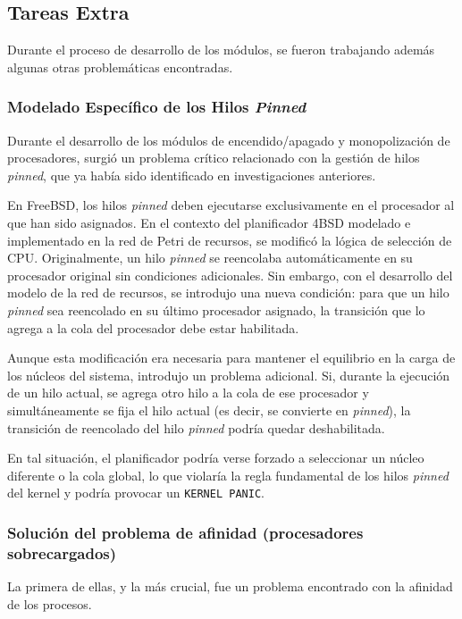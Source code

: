 \subsection{Tareas Extra}

Durante el proceso de desarrollo de los módulos, se fueron trabajando además algunas otras problemáticas encontradas.

\subsubsection{Modelado Específico de los Hilos \textit{Pinned}}

Durante el desarrollo de los módulos de encendido/apagado y monopolización de procesadores, surgió un problema crítico relacionado con la gestión de hilos \textit{pinned}, que ya había sido identificado en investigaciones anteriores.

En FreeBSD, los hilos \textit{pinned} deben ejecutarse exclusivamente en el procesador al que han sido asignados. En el contexto del planificador 4BSD modelado e implementado en la red de Petri de recursos, se modificó la lógica de selección de CPU. Originalmente, un hilo \textit{pinned} se reencolaba automáticamente en su procesador original sin condiciones adicionales. Sin embargo, con el desarrollo del modelo de la red de recursos, se introdujo una nueva condición: para que un hilo \textit{pinned} sea reencolado en su último procesador asignado, la transición que lo agrega a la cola del procesador debe estar habilitada.

Aunque esta modificación era necesaria para mantener el equilibrio en la carga de los núcleos del sistema, introdujo un problema adicional. Si, durante la ejecución de un hilo actual, se agrega otro hilo a la cola de ese procesador y simultáneamente se fija el hilo actual (es decir, se convierte en \textit{pinned}), la transición de reencolado del hilo \textit{pinned} podría quedar deshabilitada.

En tal situación, el planificador podría verse forzado a seleccionar un núcleo diferente o la cola global, lo que violaría la regla fundamental de los hilos \textit{pinned} del kernel y podría provocar un \texttt{KERNEL PANIC}.

\subsubsection{Solución del problema de afinidad (procesadores sobrecargados)}

La primera de ellas, y la más crucial, fue un problema encontrado con la afinidad de los procesos.

